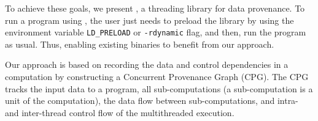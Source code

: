 To achieve these goals, we present \projecttitle, a threading library for data provenance. To run a program using \projecttitle,  the user just needs to preload the \projecttitle library  by using the environment variable {\tt LD\_PRELOAD} or {\tt -rdynamic} flag, and then, run the program as usual. Thus, enabling existing binaries to benefit from our approach. 


Our approach is based on recording the data and control dependencies in a computation by constructing a Concurrent Provenance Graph (CPG). The CPG tracks the input data to a program, all sub-computations (a sub-computation is a unit of the computation), the data flow between sub-computations, and intra- and inter-thread control flow of the multithreaded execution.


%
%
%
%
%


